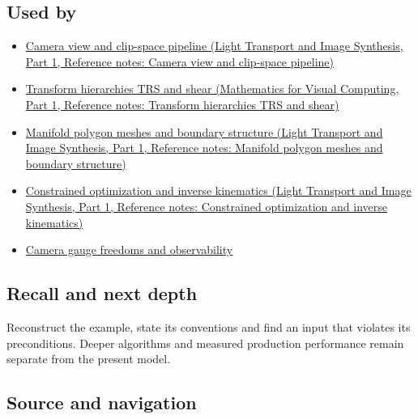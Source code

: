 \subsection{Used by}\label{appendix-1bae9457dbc3-used-by}

\hypertarget{appendix-1bae9457dbc3-used-by}{}

\begin{itemize}
\item
  \href{../04-Light-Transport-and-Image-Synthesis-P01/main.pdf\#nameddest=appendix-1c07d64f5e70}{Camera view and clip-space pipeline (Light Transport and Image Synthesis, Part 1, Reference notes: Camera view and clip-space pipeline)}
\item
  \href{../02-Mathematics-for-Visual-Computing-P01/main.pdf\#nameddest=appendix-292c061cd47c}{Transform hierarchies TRS and shear (Mathematics for Visual Computing, Part 1, Reference notes: Transform hierarchies TRS and shear)}
\item
  \href{../04-Light-Transport-and-Image-Synthesis-P01/main.pdf\#nameddest=appendix-fab348609369}{Manifold polygon meshes and boundary structure (Light Transport and Image Synthesis, Part 1, Reference notes: Manifold polygon meshes and boundary structure)}
\item
  \href{../04-Light-Transport-and-Image-Synthesis-P01/main.pdf\#nameddest=appendix-29f4bea4c2bb}{Constrained optimization and inverse kinematics (Light Transport and Image Synthesis, Part 1, Reference notes: Constrained optimization and inverse kinematics)}
\item
  \hyperref[appendix-113f0267e5f4]{Camera gauge freedoms and observability}
\end{itemize}

\subsection{Recall and next depth}\label{appendix-1bae9457dbc3-recall-and-next-depth}

\hypertarget{appendix-1bae9457dbc3-recall-and-next-depth}{}

Reconstruct the example, state its conventions and find an input that violates its preconditions. Deeper algorithms and measured production performance remain separate from the present model.

\subsection{Source and navigation}\label{appendix-1bae9457dbc3-source-and-navigation}

